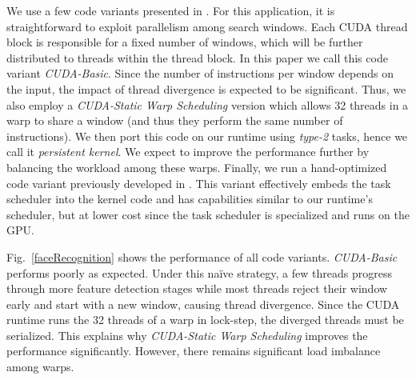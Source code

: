 We use a few code variants presented in \cite{facedetection_dws}.
For this application, it is straightforward to exploit parallelism among search windows.
Each CUDA thread block is responsible for a fixed number of windows, which will be further distributed to threads within the thread block.
In this paper we call this code variant {\em CUDA-Basic}.
Since the number of instructions per window depends on the input, the impact of thread divergence is expected to be significant.
Thus, we also employ a {\em CUDA-Static Warp Scheduling} version which allows 32 threads in a warp to share a window (and thus they perform the same number of instructions).
We then port this code on our runtime using {\em type-2} tasks, hence we call it {\em persistent kernel}.
We expect to improve the performance further by balancing the workload among these warps.
Finally, we run a hand-optimized code variant previously developed in \cite{facedetection_dws}.
This variant effectively embeds the task scheduler into the kernel code and has capabilities similar to our runtime's scheduler,
but at lower cost since the task scheduler is specialized and runs on the GPU.

Fig.~\ref{faceRecognition} shows the performance of all code variants.
{\em CUDA-Basic} performs poorly as expected.
Under this na{\"i}ve strategy, a few threads progress through more feature detection stages while most threads reject their window early and start with a new window, causing thread divergence.
Since the CUDA runtime runs the 32 threads of a warp in lock-step, the diverged threads must be serialized.
This explains why {\em CUDA-Static Warp Scheduling} improves the performance significantly.
However, there remains significant load imbalance among warps.

